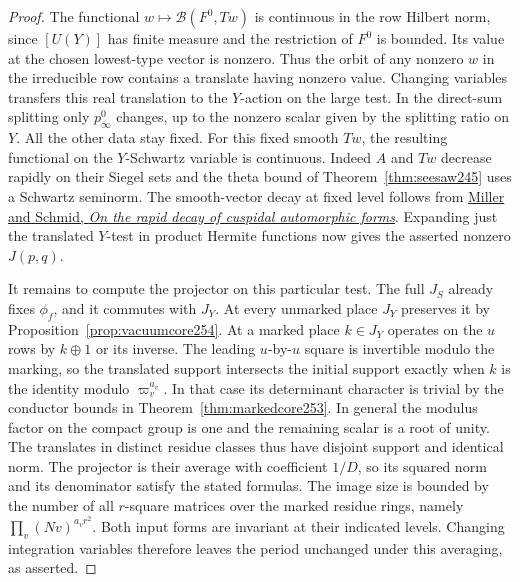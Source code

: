 \documentclass[a4paper,11pt]{article}
\theoremstyle{definition}
\theoremstyle{remark}
\numberwithin{equation}{section}
\begin{document}
\begin{proof}
The functional \(w\mapsto\mathcal B(F^0,Tw)\) is continuous
in the row Hilbert norm, since \([U(Y)]\) has finite measure
and the restriction of \(F^0\) is bounded. Its value at the
chosen lowest-type vector is nonzero. Thus the orbit of
any nonzero \(w\) in the irreducible row contains a translate
having nonzero value. Changing variables transfers this real
translation to the \(Y\)-action on the large test. In the
direct-sum splitting only \(p_\infty^0\) changes, up to the
nonzero scalar given by the splitting ratio on \(Y\).
All the other data stay fixed. For this fixed smooth \(Tw\),
the resulting functional on the \(Y\)-Schwartz variable is
continuous. Indeed \(A\) and \(Tw\) decrease rapidly on their
Siegel sets and the theta bound of Theorem~\ref{thm:seesaw245}
uses a Schwartz seminorm. The smooth-vector decay at fixed
level follows from
\href{https://arxiv.org/abs/1106.2149}{Miller and Schmid,
\emph{On the rapid decay of cuspidal automorphic forms}}.
Expanding just the translated \(Y\)-test in product Hermite
functions now gives the asserted nonzero \(J(p,q)\).

It remains to compute the projector on this particular test.
The full \(J_S\) already fixes \(\phi_f\), and it commutes with
\(J_Y\). At every unmarked place \(J_Y\) preserves it by
Proposition~\ref{prop:vacuumcore254}. At a marked place
\(k\in J_Y\) operates on the \(u\) rows by \(k\oplus1\)
or its inverse. The leading \(u\)-by-\(u\) square is invertible
modulo the marking, so the translated support intersects the
initial support exactly when \(k\) is the identity modulo
\(\varpi_v^{a_v}\). In that case its determinant character is
trivial by the conductor bounds in Theorem~\ref{thm:markedcore253}.
In general the modulus factor on the compact group is one
and the remaining scalar is a root of unity. The translates
in distinct residue classes thus have disjoint support and
identical norm. The projector is their average with coefficient
\(1/D\), so its squared norm and its denominator satisfy the
stated formulas. The image size is bounded by the number of
all \(r\)-square matrices over the marked residue rings, namely
\(\prod_v(Nv)^{a_v r^2}\). Both input forms are invariant at
their indicated levels. Changing integration variables therefore
leaves the period unchanged under this averaging, as asserted.
\end{proof}
\end{document}
